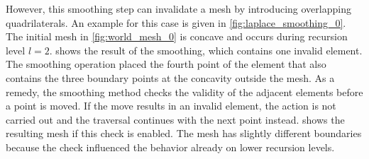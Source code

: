 However, this smoothing step can invalidate a mesh by introducing overlapping quadrilaterals. An example for this case is given in \cref{fig:laplace_smoothing_0}. The initial mesh in \cref{fig:world_mesh_0} is concave and occurs during recursion level $l=2$.  shows the result of the smoothing, which contains one invalid element. The smoothing operation placed the fourth point of the element that also contains the three boundary points at the concavity outside the mesh. As a remedy, the smoothing method checks the validity of the adjacent elements before a point is moved. If the move results in an invalid element, the action is not carried out and the traversal continues with the next point instead.
 shows the resulting mesh if this check is enabled. The mesh has slightly different boundaries because the check influenced the behavior already on lower recursion levels.


